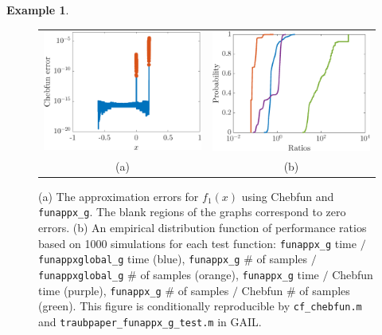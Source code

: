 \documentclass[review]{elsarticle}
\theoremstyle{definition}
\newtheorem{exmp}{Example}
\newcommand{\funappxg}{\texttt{funappx\_g}\xspace}
\newcommand{\funappxglobalg}{\texttt{funappxglobal\_g}\xspace}
\begin{document}
\begin{exmp}
%
\begin{figure}[tb]
\centering
\begin{tabular}{cc}
\includegraphics[width=5.7cm]{figure/chebfun_errors.eps} \hspace{-2.5ex} &
\includegraphics[width=5.7cm]{figure/traub_funappx_g_test.eps}
\\ (a) & (b)
\end{tabular}
\caption{(a) The approximation errors for $f_1(x)$ using  Chebfun and  
\funappxg. The blank regions of the graphs correspond to zero errors. 
(b) An empirical distribution function of performance ratios based on 1000
simulations for each test function: \funappxg{} time $/$ \funappxglobalg{} time
(blue), \funappxg{} \# of samples $/$ \funappxglobalg{} \# of samples (orange),
\funappxg{} time $/$ Chebfun time (purple), \funappxg{} \# of samples $/$
Chebfun \# of samples (green). This figure is conditionally reproducible by \texttt{cf\_chebfun.m} and
\texttt{traubpaper\_funappx\_g\_test.m} in GAIL.
\label{f3chebfig}} %
\end{figure}

\end{exmp}

\end{document}
